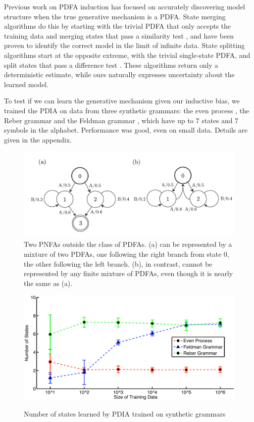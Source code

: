 Previous work on PDFA induction has focused on accurately discovering model structure when the true generative mechanism is a PDFA.  State merging algorithms do this by starting with the trivial PDFA that only accepts the training data and merging states that pass a similarity test \cite{Carrasco1994,Thollard2000}, and have been proven to identify the correct model in the limit of infinite data.  State splitting algorithms start at the opposite extreme, with the trivial single-state PDFA, and split states that pass a difference test \cite{Ron1996,Shalizi2004}.  These algorithms return only a deterministic estimate, while ours naturally expresses uncertainty about the learned model.

To test if we can learn the generative mechanism given our inductive bias, we trained the PDIA on data from three synthetic grammars: the even process \cite{Shalizi2004}, the Reber grammar \cite{Reber1967} and the Feldman grammar \cite{Feldman1966}, which have up to 7 states and 7 symbols in the alphabet.  Performance was good, even on small data.  Details are given in the appendix.

\begin{figure}[htbp]
\begin{center}
\includegraphics[scale=0.6]{pnfa.pdf}
\caption{Two PNFAs outside the class of PDFAs.  (a) can be represented by a mixture of two PDFAs, one following the right branch from state 0, the other following the left branch.  (b), in contrast, cannot be represented by any finite mixture of PDFAs, even though it is nearly the same as (a).}
\label{pnfa}
\end{center}
\end{figure}

\begin{figure}[htbp]
\begin{center}
\includegraphics[scale=0.6]{results/syntheticResults.pdf}
\label{fig:synth_results}
\caption{Number of states learned by PDIA trained on synthetic grammars}
\end{center}
\end{figure}

